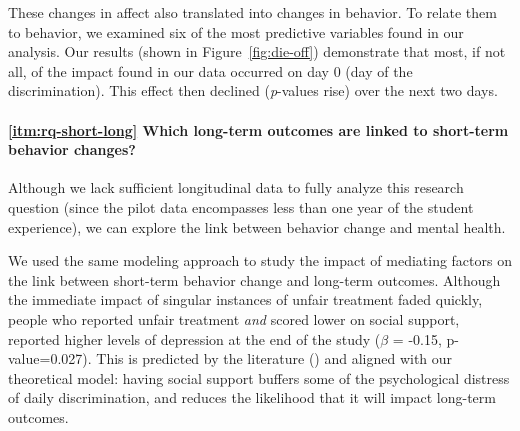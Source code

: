 These changes in affect also translated into changes in behavior. To relate them to behavior, we examined six of the most predictive variables found in our analysis. Our results (shown in Figure~\ref{fig:die-off}) demonstrate that most, if not all, of the impact found in our data occurred on  day 0 (day of the discrimination). This effect then declined (\textit{p}-values rise) over the next two days. 

\paragraph{\ref{itm:rq-short-long} Which long-term outcomes are linked to short-term behavior changes?}
Although we lack sufficient longitudinal data to fully analyze this research question (since the pilot data encompasses less than one year of the student experience), we can explore the link between behavior change and mental health. 

We used the same modeling approach to study the impact of mediating factors on the link between short-term behavior change and long-term outcomes. Although the immediate impact of singular instances of unfair treatment faded quickly, people who reported unfair treatment \textit{and} scored lower on social support, reported higher levels of depression at the end of the study ($\beta$ = -0.15, p-value=0.027). This is predicted by the literature  (\eg \cite{Mossakowski:2014}) and aligned with our theoretical model: having social support buffers some of the psychological distress of daily discrimination, and reduces the likelihood that it will impact long-term outcomes.

